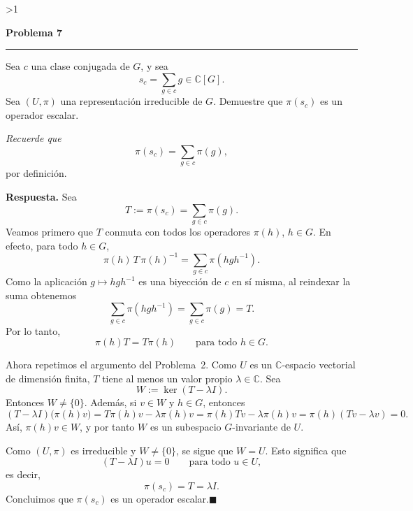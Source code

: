 \documentclass[10pt,a4paper]{article}
\newcommand{\CC}{\mathbb{C}}
\newcommand{\inlinehead}[2][repblue]{%
  \par\smallskip
  {\color{#1}\bfseries #2.}\hspace{0.45em}%
}
\newcounter{probcnt}
\newcommand{\problem}[2]{%
  \stepcounter{probcnt}%
  \ifnum\value{probcnt}>1\newpage\fi
  \par\vspace{0.25em}
  {\large\bfseries\color{repblue} Problema #1}\par
  {\color{repline}\rule{\linewidth}{0.55pt}}\par
  \begin{tcolorbox}[
    breakable,
    colback=white,
    colframe=repline,
    borderline west={1.6pt}{0pt}{repteal},
    left=0.7em,
    right=0.7em,
    top=0.35em,
    bottom=0.3em,
    before skip=0.35em,
    after skip=0.45em
  ]
    #2
  \end{tcolorbox}
}
\begin{document}
\problem{7}{%
Sea $c$ una clase conjugada de $G$, y sea
\[
  s_c = \sum_{g\in c} g \in \CC[G].
\]
Sea $(U,\pi)$ una representación irreducible de $G$. Demuestre que $\pi(s_c)$
es un operador escalar.

\smallskip
\textit{Recuerde que}
\[
  \pi(s_c) = \sum_{g\in c}\pi(g),
\]
por definición.
}

\inlinehead{Respuesta} Sea
\[
  T:=\pi(s_c)=\sum_{g\in c}\pi(g).
\]
Veamos primero que $T$ conmuta con todos los operadores $\pi(h)$, $h\in G$.
En efecto, para todo $h\in G$,
\[
  \pi(h)\,T\,\pi(h)^{-1}
  = \sum_{g\in c}\pi(hgh^{-1}).
\]
Como la aplicación $g\mapsto hgh^{-1}$ es una biyección de $c$ en sí misma,
al reindexar la suma obtenemos
\[
  \sum_{g\in c}\pi(hgh^{-1})=\sum_{g\in c}\pi(g)=T.
\]
Por lo tanto,
\[
  \pi(h)T=T\pi(h)
  \qquad\text{para todo } h\in G.
\]

Ahora repetimos el argumento del Problema~2. Como $U$ es un
$\CC$-espacio vectorial de dimensión finita, $T$ tiene al menos un valor
propio $\lambda\in\CC$. Sea
\[
  W:=\ker(T-\lambda I).
\]
Entonces $W\neq\{0\}$. Además, si $v\in W$ y $h\in G$, entonces
\[
  (T-\lambda I)\bigl(\pi(h)v\bigr)
  =T\pi(h)v-\lambda\pi(h)v
  =\pi(h)Tv-\lambda\pi(h)v
  =\pi(h)(Tv-\lambda v)=0.
\]
Así, $\pi(h)v\in W$, y por tanto $W$ es un subespacio $G$-invariante de $U$.

Como $(U,\pi)$ es irreducible y $W\neq\{0\}$, se sigue que $W=U$. Esto
significa que
\[
  (T-\lambda I)u=0
  \qquad\text{para todo } u\in U,
\]
es decir,
\[
  \pi(s_c)=T=\lambda I.
\]
Concluimos que $\pi(s_c)$ es un operador escalar.\hfill$\blacksquare$
\end{document}
